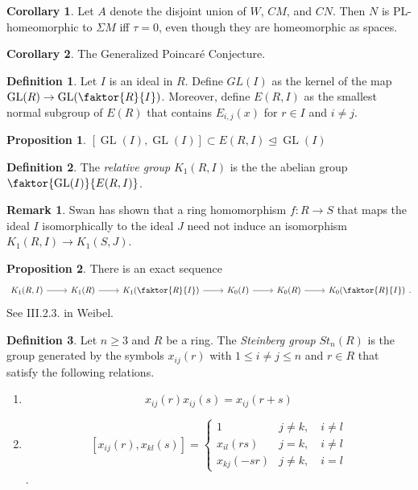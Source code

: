 \documentclass[10pt,letterpaper,cm]{nupset}
\theoremstyle{definition}
\newtheorem*{definition}{Definition}
\newtheorem{remark}{Remark}
\newtheorem{corollary}{Corollary}
\newtheorem{prop}{Proposition}
\newcommand{\1}{\mathbf{1}}
\newcommand{\0}{\vec 0}
\DeclareMathOperator*{\GL}{GL}
\begin{document}
\begin{corollary}
Let $A$ denote the disjoint union of $W$, $CM$, and $CN$. Then $N$ is PL-homeomorphic to $\Sigma M$ iff $\tau = 0$, even though they are homeomorphic as spaces.
\end{corollary}

\begin{corollary}
The Generalized Poincar\'e Conjecture.
\end{corollary}

\begin{definition}
Let $I$ is an ideal in $R$. Define $GL(I)$ as the kernel of the map $\GL(R) \to \GL(\faktor{R}{I})$. Moreover, define $E(R, I)$ as the smallest normal subgroup of $E(R)$ that contains $E_{i, j}(x)$ for $r\in I$ and $i\ne j$.
\end{definition}

\begin{prop}
$[\GL(I), \GL(I)] \subset E(R, I)\unlhd \GL(I)$
\end{prop}

\begin{definition}
The \textit{relative group} $K_1(R, I)$ is the the abelian group $\faktor{\GL(I)}{E(R, I)}$.
\end{definition}

\begin{remark}
Swan has shown that a ring homomorphism $f: R\to S$ that maps the ideal $I$ isomorphically to the ideal $J$ need not induce an isomorphism $K_1(R, I) \to K_1(S, J)$.
\end{remark}

\begin{prop}
There is an exact sequence 
\[
\begin{tikzcd}
{K_1(R, I)} \arrow[r] & K_1(R) \arrow[r] & K_1(\faktor{R}{I}) \arrow[r] & K_0(I) \arrow[r] & K_0(R) \arrow[r] & K_0(\faktor{R}{I})
\end{tikzcd}.
\] See III.2.3. in Weibel.
\end{prop}

\begin{definition}
Let $n\geq 3$ and $R$ be a ring. The \textit{Steinberg group} $St_n(R)$ is the group generated by the symbols $x_{ij}(r)$ with $1\leq i\ne j\leq n$ and $r\in R$ that satisfy the following relations.
\begin{enumerate}
\item $$x_{ij}(r)x_{ij}(s) = x_{ij}(r+s)$$
\item 
\[ [x_{ij}(r), x_{kl}(s)] = 
\begin{cases}
1 & j\ne k, \quad i\ne l \\
x_{il}(rs) & j= k, \quad i\ne l \\
x_{kj}(-sr) & j \ne k, \quad i=l
\end{cases} \].
\end{enumerate}
\end{definition}
\end{document}
